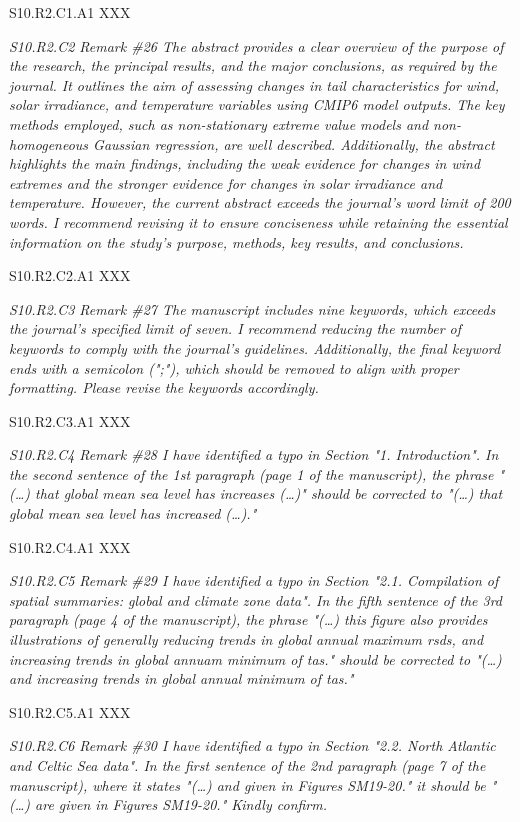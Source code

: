 \documentclass[a4paper,10pt]{article}
\begin{document}
	S10.R2.C1.A1 XXX

	\emph{S10.R2.C2 Remark \#26 The abstract provides a clear overview of the purpose of the research, the principal results, and the major conclusions, as required by the journal. It outlines the aim of assessing changes in tail characteristics for wind, solar irradiance, and temperature variables using CMIP6 model outputs. The key methods employed, such as non-stationary extreme value models and non-homogeneous Gaussian regression, are well described. Additionally, the abstract highlights the main findings, including the weak evidence for changes in wind extremes and the stronger evidence for changes in solar irradiance and temperature. However, the current abstract exceeds the journal's word limit of 200 words. I recommend revising it to ensure conciseness while retaining the essential information on the study's purpose, methods, key results, and conclusions.}

	S10.R2.C2.A1 XXX

	\emph{S10.R2.C3 Remark \#27 The manuscript includes nine keywords, which exceeds the journal's specified limit of seven. I recommend reducing the number of keywords to comply with the journal's guidelines. Additionally, the final keyword ends with a semicolon (";"), which should be removed to align with proper formatting. Please revise the keywords accordingly.}

	S10.R2.C3.A1 XXX

	\emph{S10.R2.C4 Remark \#28 I have identified a typo in Section "1. Introduction". In the second sentence of the 1st paragraph (page 1 of the manuscript), the phrase "(…) that global mean sea level has increases (…)" should be corrected to "(…) that global mean sea level has increased (…)."}

	S10.R2.C4.A1 XXX

	\emph{S10.R2.C5 Remark \#29 I have identified a typo in Section "2.1. Compilation of spatial summaries: global and climate zone data". In the fifth sentence of the 3rd paragraph (page 4 of the manuscript), the phrase "(…) this figure also provides illustrations of generally reducing trends in global annual maximum rsds, and increasing trends in global annuam minimum of tas." should be corrected to "(…) and increasing trends in global annual minimum of tas."}

	S10.R2.C5.A1 XXX

	\emph{S10.R2.C6 Remark \#30 I have identified a typo in Section "2.2. North Atlantic and Celtic Sea data". In the first sentence of the 2nd paragraph (page 7 of the manuscript), where it states "(…) and given in Figures SM19-20." it should be "(…) are given in Figures SM19-20." Kindly confirm.}
\end{document}
